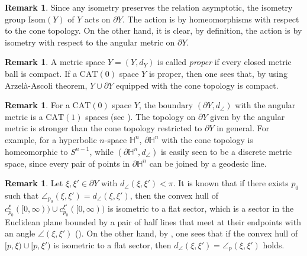 \documentclass[12pt]{amsart}
\numberwithin{equation}{section}
\theoremstyle{plain}
\theoremstyle{definition}
\newtheorem{Remark}[Theorem]{Remark}
\theoremstyle{remark}
\newcommand{\isom}[1]{\mathrm{Isom}({#1})}
\newcommand{\cat}[1]{\mathrm{CAT}(#1)}
\newcommand{\ray}[1]{[#1)}
\newcommand{\cc}[2]{c_{#1}^{#2}}
\begin{document}
\begin{Remark}
 Since any isometry preserves the relation asymptotic, the isometry
 group $\isom{Y}$ of $Y$ acts on $\partial Y$.  
 The action is by homeomorphisms with respect to the cone topology. 
 On the other hand, it is clear, by definition, the action is by
 isometry with respect to the angular metric on $\partial Y$. 
\end{Remark}

\begin{Remark}
 \label{rem:proper_implies_cpt}
 A metric space $Y=(Y,d_Y)$ is called {\it proper} if every
 closed metric ball is compact. 
 If a $\cat{0}$ space $Y$ is proper, then one sees that, by using 
 Arzel\`a-Ascoli theorem, 
 $Y\cup \partial Y$ equipped with the cone topology is compact. 
\end{Remark}

\begin{Remark}
 For a $\cat{0}$ space $Y$, the boundary $(\partial Y, d_{\angle})$ with
 the angular metric is a $\cat{1}$ spaces
 (see \cite[p.~285, 9.13 Theorem]{bridson-haefliger}). 
 The topology on $\partial Y$ given by the angular metric is stronger
 than the cone topology restricted to $\partial Y$ in general. 
 For example, for a hyperbolic $n$-space $\mathbb{H}^n$,  
 $\partial \mathbb{H}^n$ with the cone topology is homeomorphic to
 $S^{n-1}$,  while $(\partial \mathbb{H}^n,d_{\angle})$ is easily seen
 to be a discrete metric space, since every pair of points in
 $\partial\mathbb{H}^n$ can be joined by a geodesic line. 
\end{Remark}

\begin{Remark}
 \label{rem:sector}
 Let $\xi, \xi' \in \partial Y$ with $d_{\angle}(\xi,\xi')<\pi$. 
 It is known that if there exists $p_0$ such that 
 $\angle_{p_0}(\xi,\xi')=d_{\angle}(\xi,\xi')$, then the convex hull of 
 $\cc{p_0}{\xi}(\ray{0,\infty})\cup \cc{p_0}{\xi'}(\ray{0,\infty})$ is
 isometric to a flat sector, which is a sector in the Euclidean plane
 bounded by a pair of half lines that meet at their endpoints with an
 angle $\angle(\xi,\xi')$ 
 (\cite[p.~283, 9.9 Corollary]{bridson-haefliger}).
 On the other hand, 
 by \cite[p.~281, 9.8 Proposition (2)]{bridson-haefliger}, one sees that
 if the convex hull of $\ray{p,\xi}\cup \ray{p,\xi'}$ is isometric to a
 flat sector, then $d_{\angle}(\xi,\xi')=\angle_p(\xi,\xi')$ holds. 
\end{Remark}
\end{document}
